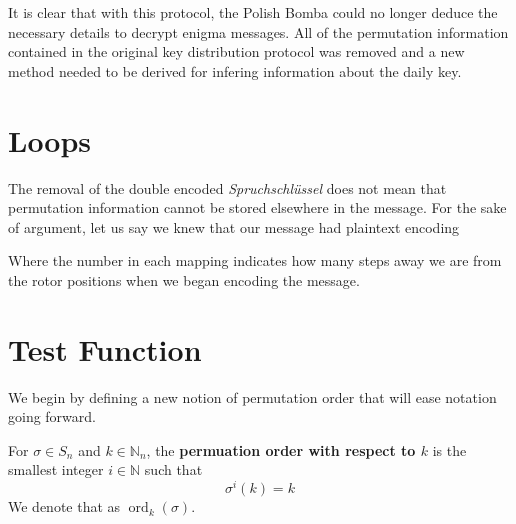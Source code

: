 It is clear that with this protocol, the Polish Bomba could no longer deduce the necessary 
details to decrypt enigma messages. All of the permutation information contained in the original key distribution 
protocol was removed and a new method needed to be derived for infering information about the daily key.
\section{Loops}
The removal of the double encoded \emph{Spruchschlüssel} does not mean that permutation information cannot be stored elsewhere in the message. 
For the sake of argument, let us say we knew that our message had plaintext encoding

\begin{center}
\end{center}

Where the number in each mapping indicates how many steps away we are from the rotor 
positions when we began encoding the message.

\section{Test Function}

We begin by defining a new notion of permutation order that will ease notation going forward. 

\begin{definition}
    For $\sigma\in S_n$ and $k\in\mathbb{N}_n$, the \textbf{permuation order with respect to $k$}
    is the smallest integer $i\in\mathbb{N}$ such that 
    \[
        \sigma^i(k) = k
    \]
    We denote that as $\operatorname{ord}_k(\sigma)$.
\end{definition}

